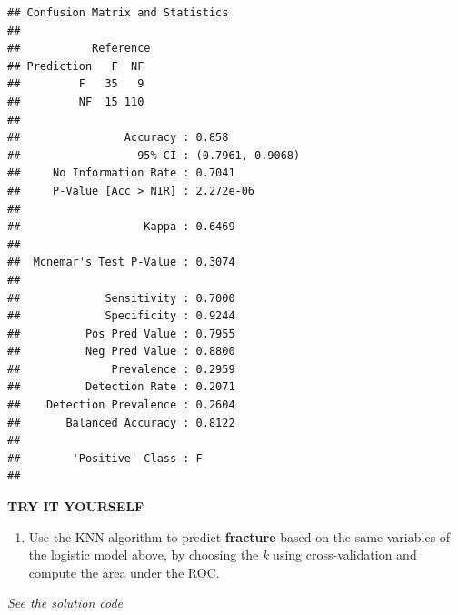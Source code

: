 \documentclass[
]{book}
\newenvironment{Shaded}{\begin{snugshade}}{\end{snugshade}}
\newcommand{\AttributeTok}[1]{\textcolor[rgb]{0.13,0.29,0.53}{#1}}
\newcommand{\CommentTok}[1]{\textcolor[rgb]{0.56,0.35,0.01}{\textit{#1}}}
\newcommand{\FunctionTok}[1]{\textcolor[rgb]{0.13,0.29,0.53}{\textbf{#1}}}
\newcommand{\NormalTok}[1]{#1}
\newcommand{\OtherTok}[1]{\textcolor[rgb]{0.56,0.35,0.01}{#1}}
\newcommand{\SpecialCharTok}[1]{\textcolor[rgb]{0.81,0.36,0.00}{\textbf{#1}}}
\providecommand{\tightlist}{%
  \setlength{\itemsep}{0pt}\setlength{\parskip}{0pt}}
\begin{document}
\begin{Shaded}
\end{Shaded}

\begin{verbatim}
## Confusion Matrix and Statistics
## 
##           Reference
## Prediction   F  NF
##         F   35   9
##         NF  15 110
##                                           
##                Accuracy : 0.858           
##                  95% CI : (0.7961, 0.9068)
##     No Information Rate : 0.7041          
##     P-Value [Acc > NIR] : 2.272e-06       
##                                           
##                   Kappa : 0.6469          
##                                           
##  Mcnemar's Test P-Value : 0.3074          
##                                           
##             Sensitivity : 0.7000          
##             Specificity : 0.9244          
##          Pos Pred Value : 0.7955          
##          Neg Pred Value : 0.8800          
##              Prevalence : 0.2959          
##          Detection Rate : 0.2071          
##    Detection Prevalence : 0.2604          
##       Balanced Accuracy : 0.8122          
##                                           
##        'Positive' Class : F               
## 
\end{verbatim}

\textbf{TRY IT YOURSELF}

\begin{enumerate}
\def\labelenumi{\arabic{enumi})}
\tightlist
\item
  Use the KNN algorithm to predict \textbf{fracture} based on the same variables
  of the logistic model above, by choosing the \emph{k} using cross-validation and
  compute the area under the ROC.
\end{enumerate}

\emph{See the solution code}
\end{document}
